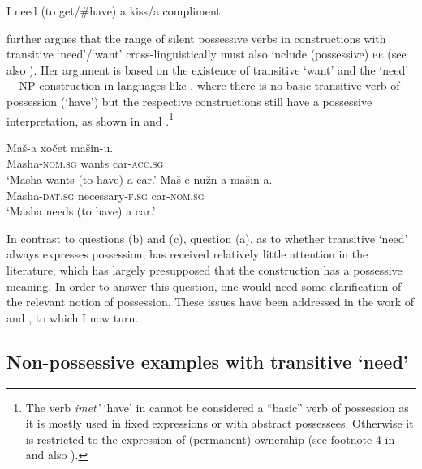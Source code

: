 \documentclass[output=paper,colorlinks,citecolor=brown]{langscibook}
\begin{document}
\ea\label{get} I need (to get/\#have) a kiss/a compliment.\hfill \citep[215]{Harves2008}\label{need-get}
\z

\noindent \citet{Harves2008} further argues that the range of silent possessive verbs in constructions with transitive `need'/`want' cross-linguistically must also include (possessive) \textsc{be} (see also \citealt{Harves.Kayne2012}). Her argument is based on the existence of transitive `want' and the `need' + NP construction in languages like , where there is no basic transitive verb of possession (`have') but the respective constructions still have a possessive interpretation, as shown in  and .\footnote{\label{footnote-imet}The verb \textit{imet'} `have' in  cannot be considered a ``basic'' verb of possession as it is mostly used in fixed expressions or with abstract possessees. Otherwise it is restricted to the expression of (permanent) ownership (see footnote 4 in \citealt{Harves.Kayne2012} and also \citealt[440ff.]{Stolz.Kettler.Stroh.Urdze2008}).}

\ea
\ea \gll Maš-a xočet mašin-u.\label{xotet}\\
Masha-\textsc{nom.sg} wants car-\textsc{acc.sg}\\
\glt `Masha wants (to have) a car.'
\ex \gll Maš-e nužn-a mašin-a.\label{nuzhen}\\
Masha-\textsc{dat.sg} necessary-\textsc{f.sg} car-\textsc{nom.sg}\\
\glt `Masha needs (to have) a car.'
\z\z

\noindent In contrast to questions (b) and (c), question (a), as to whether transitive `need' always expresses possession, has received relatively little attention in the literature, which has largely presupposed that the construction has a possessive meaning. In order to answer this question, one would need some clarification of the relevant notion of possession. These issues have been addressed in the work of \citet{Schwarz2006} and \citet{Zaroukian.Beller2013}, to which I now turn.

\subsection{Non-possessive examples with transitive `need'}\label{section-problematic}
\end{document}
